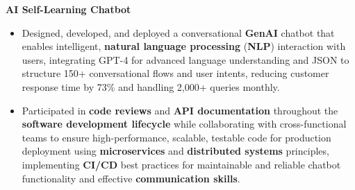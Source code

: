 \documentclass[a4paper,10pt]{article}
\begin{document}
\vspace{-2mm}
\textbf{\textbf{AI} Self-Learning Chatbot} \\
\begin{itemize}[leftmargin=*, itemsep=0pt, parsep=1pt]
\vspace{-7mm}
    \item Designed, developed, and deployed a conversational \textbf{GenAI} chatbot that enables intelligent, \textbf{natural language processing} (\textbf{NLP}) interaction with users, integrating GPT-4 for advanced language understanding and JSON to structure 150+ conversational flows and user intents, reducing customer response time by 73\% and handling 2,000+ queries monthly.
    \item Participated in \textbf{code reviews} and \textbf{API documentation} throughout the \textbf{software development lifecycle} while collaborating with cross-functional teams to ensure high-performance, scalable, testable code for production deployment using \textbf{microservices} and \textbf{distributed systems} principles, implementing \textbf{CI/CD} best practices for maintainable and reliable chatbot functionality and effective \textbf{communication skills}.
\end{itemize}

\vspace{-2mm}
\end{document}
